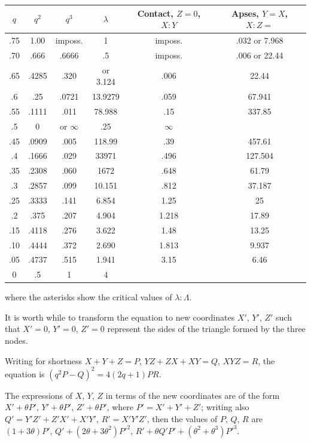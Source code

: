\documentclass[12pt,a4paper]{article}
\theoremstyle{plain}
\theoremstyle{definition}
\begin{document}
\begin{center}
\begin{tabular}{c c c c c c}
\toprule
$q$ & $q^2$ & $q^3$ & $\lambda$ & Contact, $Z=0$, $X:Y$ & Apses, $Y=X$, $X:Z=$ \\
\midrule
.75 & 1.00 & imposs. & 1 & imposs. & .032 or 7.968 \\
.70 & .666 & .6666 & .5 & imposs. & .006 or 22.44 \\
.65 & .4285 & .320 & or 3.124 & .006 & 22.44 \\
.6 & .25 & .0721 & 13.9279 & .059 & 67.941 \\
.55 & .1111 & .011 & 78.988 & .15 & 337.85 \\
.5 & 0 & or $\infty$ & .25 & $\infty$ \\
.45 & .0909 & .005 & 118.99 & .39 & 457.61 \\
.4 & .1666 & .029 & 33971 & .496 & 127.504 \\
.35 & .2308 & .060 & 1672 & .648 & 61.79 \\
.3 & .2857 & .099 & 10.151 & .812 & 37.187 \\
.25 & .3333 & .141 & 6.854 & 1.25 & 25 \\
.2 & .375 & .207 & 4.904 & 1.218 & 17.89 \\
.15 & .4118 & .276 & 3.622 & 1.48 & 13.25 \\
.10 & .4444 & .372 & 2.690 & 1.813 & 9.937 \\
.05 & .4737 & .515 & 1.941 & 3.15 & 6.46 \\
0 & .5 & 1 & 4 & \\
\bottomrule
\end{tabular}
\end{center}

where the asterisks show the critical values of $\lambda : \Lambda$.

\newpage
\setcounter{page}{5}

It is worth while to transform the equation to new coordinates $X'$, $Y'$, $Z'$ such that $X' = 0$, $Y' = 0$, $Z' = 0$ represent the sides of the triangle formed by the three nodes.

Writing for shortness $X + Y + Z = P$, $YZ + ZX + XY = Q$, $XYZ = R$, the equation is $(q^2P - Q)^2 = 4(2q + 1)PR$.

The expressions of $X$, $Y$, $Z$ in terms of the new coordinates are of the form $X' + \theta P'$, $Y' + \theta P'$, $Z' + \theta P'$, where $P' = X' + Y' + Z'$; writing also $Q' = Y'Z' + Z'X' + X'Y'$, $R' = X'Y'Z'$, then the values of $P$, $Q$, $R$ are $(1 + 3\theta)P'$, $Q' + (2\theta + 3\theta^2)P'^2$, $R' + \theta Q'P' + (\theta^2 + \theta^3)P'^3$.
\end{document}
